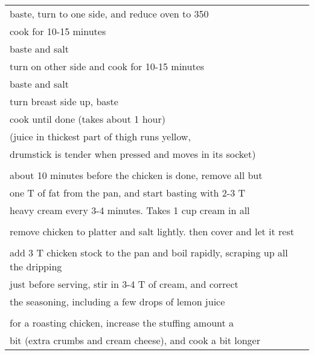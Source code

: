 \documentclass[8pt]{report}
\begin{document}
\begin{tabular}{|l|}
\hspace{0.5 in}	baste, turn to one side, and reduce oven to 350\\
\hspace{0.5 in}	cook for 10-15 minutes\\
\hspace{0.5 in}	baste and salt\\
\hspace{0.5 in}	turn on other side and cook for 10-15 minutes\\
\hspace{0.5 in}	baste and salt\\
\hspace{0.5 in}	turn breast side up, baste\\
\hspace{0.5 in}	cook until done (takes about 1 hour)\\
\hspace{0.5 in}\hspace{0.5 in}(juice in thickest part of thigh runs yellow,\\
\hspace{0.5 in}\hspace{0.5 in}drumstick is tender when pressed and moves in its socket)\\
\\
about 10 minutes before the chicken is done, remove all but\\
one T of fat from the pan, and start basting with 2-3 T\\
heavy cream every 3-4 minutes.  Takes 1 cup cream in all\\
\\
remove chicken to platter and salt lightly.  then cover and let it rest\\
\\
add 3 T chicken stock to the pan and boil rapidly, scraping up all the dripping\\
just before serving, stir in 3-4 T of cream, and correct\\
the seasoning, including a few drops of lemon juice\\
\\
for a roasting chicken, increase the stuffing amount a\\
bit (extra crumbs and cream cheese), and cook a bit longer\\


\hline

\end{tabular}

\newpage
\end{document}
